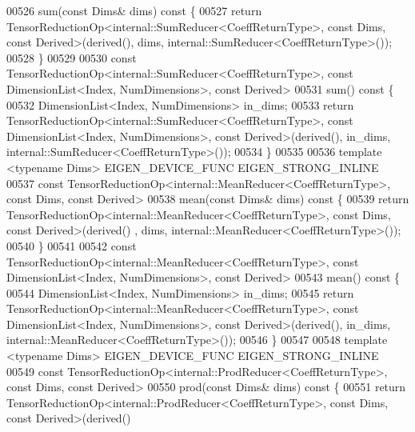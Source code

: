 \begin{DoxyCode}
00526     sum(\textcolor{keyword}{const} Dims& dims)\textcolor{keyword}{ const }\{
00527       \textcolor{keywordflow}{return} TensorReductionOp<internal::SumReducer<CoeffReturnType>, \textcolor{keyword}{const} Dims, \textcolor{keyword}{const} Derived>(derived(),
       dims, internal::SumReducer<CoeffReturnType>());
00528     \}
00529 
00530     \textcolor{keyword}{const} TensorReductionOp<internal::SumReducer<CoeffReturnType>, \textcolor{keyword}{const} DimensionList<Index,
       NumDimensions>, \textcolor{keyword}{const} Derived>
00531     sum()\textcolor{keyword}{ const }\{
00532       DimensionList<Index, NumDimensions> in\_dims;
00533       \textcolor{keywordflow}{return} TensorReductionOp<internal::SumReducer<CoeffReturnType>, \textcolor{keyword}{const} DimensionList<Index,
       NumDimensions>, \textcolor{keyword}{const} Derived>(derived(), in\_dims, internal::SumReducer<CoeffReturnType>());
00534     \}
00535 
00536     \textcolor{keyword}{template} <\textcolor{keyword}{typename} Dims> EIGEN\_DEVICE\_FUNC EIGEN\_STRONG\_INLINE
00537     \textcolor{keyword}{const} TensorReductionOp<internal::MeanReducer<CoeffReturnType>, \textcolor{keyword}{const} Dims, \textcolor{keyword}{const} Derived>
00538     mean(\textcolor{keyword}{const} Dims& dims)\textcolor{keyword}{ const }\{
00539       \textcolor{keywordflow}{return} TensorReductionOp<internal::MeanReducer<CoeffReturnType>, \textcolor{keyword}{const} Dims, \textcolor{keyword}{const} Derived>(derived()
      , dims, internal::MeanReducer<CoeffReturnType>());
00540     \}
00541 
00542     \textcolor{keyword}{const} TensorReductionOp<internal::MeanReducer<CoeffReturnType>, \textcolor{keyword}{const} DimensionList<Index,
       NumDimensions>, \textcolor{keyword}{const} Derived>
00543     mean()\textcolor{keyword}{ const }\{
00544       DimensionList<Index, NumDimensions> in\_dims;
00545       \textcolor{keywordflow}{return} TensorReductionOp<internal::MeanReducer<CoeffReturnType>, \textcolor{keyword}{const} DimensionList<Index,
       NumDimensions>, \textcolor{keyword}{const} Derived>(derived(), in\_dims, internal::MeanReducer<CoeffReturnType>());
00546     \}
00547 
00548     \textcolor{keyword}{template} <\textcolor{keyword}{typename} Dims> EIGEN\_DEVICE\_FUNC EIGEN\_STRONG\_INLINE
00549     \textcolor{keyword}{const} TensorReductionOp<internal::ProdReducer<CoeffReturnType>, \textcolor{keyword}{const} Dims, \textcolor{keyword}{const} Derived>
00550     prod(\textcolor{keyword}{const} Dims& dims)\textcolor{keyword}{ const }\{
00551       \textcolor{keywordflow}{return} TensorReductionOp<internal::ProdReducer<CoeffReturnType>, \textcolor{keyword}{const} Dims, \textcolor{keyword}{const} Derived>(derived()

\end{DoxyCode}
